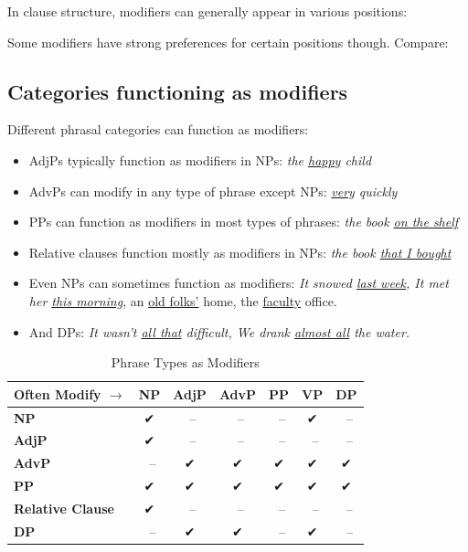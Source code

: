 In clause structure, modifiers can generally appear in various positions:

\ea\label{ex:vp-modifiers}
   \z
\z

Some modifiers have strong preferences for certain positions though. Compare:

\ea\label{ex:modifier-position}
   \z
\z

\subsection{Categories functioning as modifiers}

Different phrasal categories can function as modifiers:

\begin{itemize}[noitemsep]
   \item AdjPs typically function as modifiers in NPs: \textit{the \uline{happy} child}
   \item AdvPs can modify in any type of phrase except NPs: \textit{\uline{very} quickly}
   \item PPs can function as modifiers in most types of phrases: \textit{the book \uline{on the shelf}}
   \item Relative clauses function mostly as modifiers in NPs: \textit{the book \uline{that I bought}}
   \item Even NPs can sometimes function as modifiers: \textit{It snowed \uline{last week}, It met her \uline{this morning}}, an \uline{old folks'} home, the \uline{faculty} office.
   \item And DPs: \textit{It wasn't \uline{all that} difficult, We drank \uline{almost all} the water.}
\end{itemize}

\begin{table}[h]
\centering
\begin{tabular}{lcccccc}
\hline
Often Modify $\rightarrow$ & NP & AdjP & AdvP & PP & VP & DP \\
\hline
\textbf{NP} & ✔ &~-- &~-- &~-- & ✔ &~-- \\
\textbf{AdjP} & ✔ &~-- &~-- &~-- &~-- &~-- \\
\textbf{AdvP} &~-- & ✔ & ✔ & ✔ & ✔ & ✔ \\
\textbf{PP} & ✔ & ✔ & ✔ & ✔ & ✔ & ✔ \\
\textbf{Relative Clause} & ✔ &~-- &~-- &~-- &~-- &~-- \\
\textbf{DP} &~-- & ✔ & ✔ &~-- & ✔ &~-- \\
\hline
\end{tabular}
\caption{Phrase Types as Modifiers}
\label{tab:modifiers}
\end{table}

